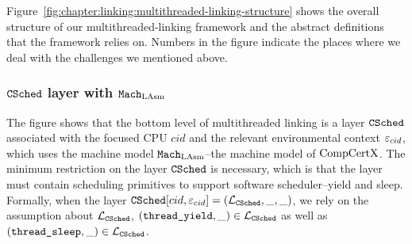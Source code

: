 Figure~\ref{fig:chapter:linking:multithreaded-linking-structure} shows the overall structure of our multithreaded-linking framework and the abstract definitions that the framework relies on.
Numbers in the figure indicate the places where we deal with the challenges we  mentioned above.

\subsubsection{${{\mathrm{\texttt{CSched}}}}$ layer with ${\mathrm{\texttt{Mach}}}_{\mathrm{LAsm}}$} 


The figure shows that the bottom level of multithreaded linking is a layer ${{\mathrm{\texttt{CSched}}}}$ associated with the focused CPU $cid$ and the relevant environmental context ${\varepsilon}_{cid}$, 
which uses the machine model ${\mathrm{\texttt{Mach}}}_{\mathrm{LAsm}}$--the machine model of $\mathrm{CompCertX}$. 
The minimum restriction on the layer ${{\mathrm{\texttt{CSched}}}}$ is necessary, 
which is that the layer must contain scheduling primitives to support software scheduler--yield and sleep.
Formally, 
when the layer ${{\mathrm{\texttt{CSched}}}}[cid, {\varepsilon}_{cid}] = (\mathcal{L}_{{{\mathrm{\texttt{CSched}}}}}, \_, \_)$,
we rely on the assumption about $\mathcal{L}_{{{\mathrm{\texttt{CSched}}}}}$, 
$({\mathrm{\texttt{thread\_yield}}}, \_) \in \mathcal{L}_{{{\mathrm{\texttt{CSched}}}}}$ as well as 
$({\mathrm{\texttt{thread\_sleep}}}, \_) \in \mathcal{L}_{{{\mathrm{\texttt{CSched}}}}}$. 


